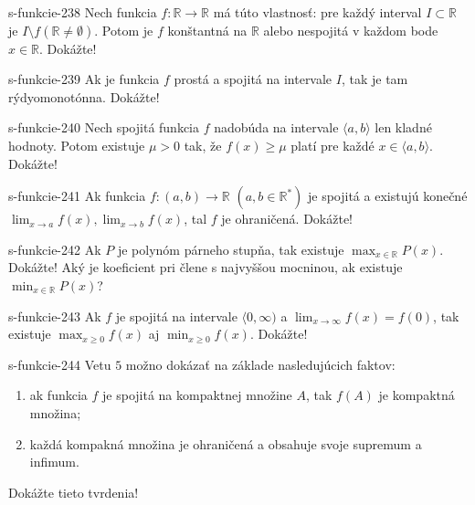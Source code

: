   \begin{defproblem}{s-funkcie-238}
  Nech funkcia $f: \mathbb{R} \rightarrow \mathbb{R}$ má túto vlastnosť: pre každý interval $I \subset \mathbb{R}$ je $I \setminus f(\mathbb{R} \neq \emptyset)$. Potom je $f$ konštantná na $\mathbb{R}$ alebo nespojitá v každom bode $x \in \mathbb{R}$. Dokážte!
  \end{defproblem}

  \begin{defproblem}{s-funkcie-239}
  Ak je funkcia $f$ prostá a spojitá na intervale $I$, tak je tam rýdyomonotónna. Dokážte!
  \end{defproblem}

  \begin{defproblem}{s-funkcie-240}
  Nech spojitá funkcia $f$ nadobúda na intervale $\langle a,b \rangle$ len kladné hodnoty. Potom existuje $\mu > 0$ tak, že $f(x) \geq \mu$ platí pre každé $x \in \langle a,b \rangle$. Dokážte!
  \end{defproblem}

  \begin{defproblem}{s-funkcie-241}
  Ak funkcia $f: (a,b) \rightarrow \mathbb{R}$ $(a,b\in \mathbb{R^*})$ je spojitá a existujú konečné $\lim_{x \rightarrow a}f(x),\lim_{x \rightarrow b}f(x)$, tal $f$ je ohraničená. Dokážte!
  \end{defproblem}

  \begin{defproblem}{s-funkcie-242}
  Ak $P$ je polynóm párneho stupňa, tak existuje $\max_{x \in \mathbb{R}} P(x)$. Dokážte! Aký je koeficient pri člene s najvyššou mocninou, ak existuje $\min_{x \in \mathbb{R}} P(x)$?
  \end{defproblem}

  \begin{defproblem}{s-funkcie-243}
  Ak $f$ je spojitá na intervale $\langle0,\infty)$ a $\lim_{x \rightarrow \infty} f(x)=f(0)$, tak existuje $\max_{x \geq 0} f(x)$ aj $\min_{x \geq 0}f(x)$. Dokážte!
  \end{defproblem}

  \begin{defproblem}{s-funkcie-244}
  Vetu $5$ možno dokázať na základe nasledujúcich faktov:
  \begin{enumerate}
  \item ak funkcia $f$ je spojitá na kompaktnej množine $A$, tak $f(A)$ je kompaktná množina;
  \item každá kompakná množina je ohraničená a obsahuje svoje supremum a infimum.
  \end{enumerate}
  Dokážte tieto tvrdenia!
  \end{defproblem}

